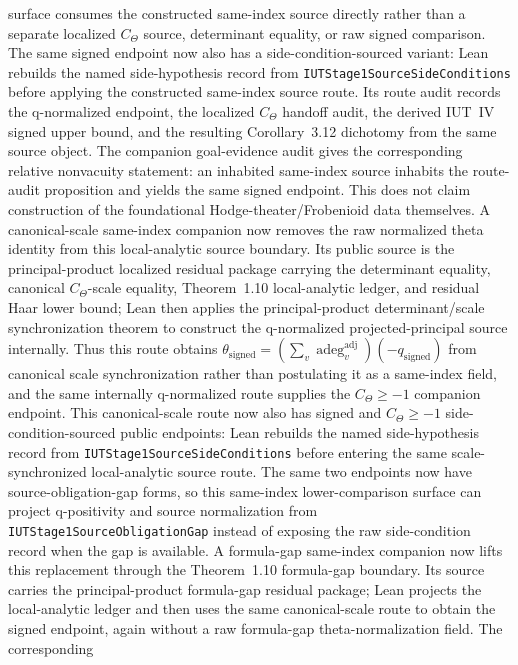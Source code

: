\documentclass[11pt]{article}
\theoremstyle{plain}
\theoremstyle{definition}
\theoremstyle{remark}
\begin{document}
surface consumes the constructed same-index source directly rather than a
separate localized \(C_\Theta\) source, determinant equality, or raw signed
comparison.  The same signed endpoint now also has a side-condition-sourced
variant: Lean rebuilds the named side-hypothesis record from
\texttt{IUTStage1SourceSideConditions} before applying the constructed
same-index source route.  Its route audit records the q-normalized endpoint, the localized
\(C_\Theta\) handoff audit, the derived IUT~IV signed upper bound, and the
resulting Corollary~3.12 dichotomy from the same source object.  The companion
goal-evidence audit gives the corresponding relative nonvacuity statement: an
inhabited same-index source inhabits the route-audit proposition and yields the
same signed endpoint.  This does not claim construction of the foundational
Hodge-theater/Frobenioid data themselves.
A canonical-scale same-index companion now removes the raw normalized theta
identity from this local-analytic source boundary.  Its public source is the
principal-product localized residual package carrying the determinant equality,
canonical \(C_\Theta\)-scale equality, Theorem~1.10 local-analytic ledger, and
residual Haar lower bound; Lean then applies the principal-product
determinant/scale synchronization theorem to construct the q-normalized
projected-principal source internally.  Thus this route obtains
\(\theta_{\mathrm{signed}}=(\sum_v \operatorname{adeg}^{\mathrm{adj}}_v)
(-q_{\mathrm{signed}})\) from canonical scale synchronization rather than
postulating it as a same-index field, and the same internally q-normalized
route supplies the \(C_\Theta\geq -1\) companion endpoint.  This
canonical-scale route now also has signed and \(C_\Theta\geq -1\)
side-condition-sourced public endpoints: Lean rebuilds the named
side-hypothesis record from \texttt{IUTStage1SourceSideConditions} before
entering the same scale-synchronized local-analytic source route.  The same
two endpoints now have source-obligation-gap forms, so this same-index
lower-comparison surface can project q-positivity and source normalization
from \texttt{IUTStage1SourceObligationGap} instead of exposing the raw
side-condition record when the gap is available.
A formula-gap same-index companion now lifts this replacement through the
Theorem~1.10 formula-gap boundary.  Its source carries the principal-product
formula-gap residual package; Lean projects the local-analytic ledger and then
uses the same canonical-scale route to obtain the signed endpoint, again
without a raw formula-gap theta-normalization field.  The corresponding
\end{document}
